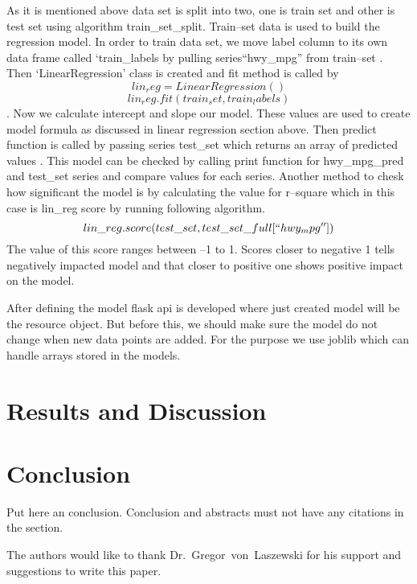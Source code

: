    As it is mentioned above data set is split into two, one is train
   set and other is test set using algorithm train\_set\_split. 
   Train--set data is used to build the regression
   model. In order to train data set, we move label column to its own data frame
   called `train\_labels by pulling  series``hwy\_mpg'' from 
   train--set \cite{regression}. Then `LinearRegression' class is created and fit 
   method is called by \[lin_reg = LinearRegression()\] 
   \[lin_reg.fit(train_set, train_labels)\]. Now we calculate intercept and
  slope our model. These values are used to create model formula
  as discussed in linear regression section above. Then predict function is
  called  by passing series test\_set which returns an array of predicted 
  values \cite{regression}. This model can be checked by calling print function
  for hwy\_mpg\_pred
  and test\_set series and compare values for each series. Another method to
  chesk how significant the model is by calculating the value for r--square 
  which in this case is lin\_reg score by running following algorithm.  
  \[lin\_reg.score(test\_set, test\_set\_full[``hwy_mpg''])\]
  The value of this score ranges between --1 to 1. Scores closer to negative 1
  tells negatively impacted model and that closer to positive one shows positive 
  impact on the model.
  
  After defining the model flask api is developed where just created model will 
  be the resource object. But before this, we should make sure the model do not 
  change when new data points are added. For the purpose we use joblib which can
  handle arrays stored in the models.
  
   
  
\section{Results and Discussion}
  
\section{Conclusion}

Put here an conclusion. Conclusion and abstracts must not have any
citations in the section.


\begin{acks}

  The authors would like to thank Dr.~Gregor~von~Laszewski for his
  support and suggestions to write this paper.

\end{acks}


 
